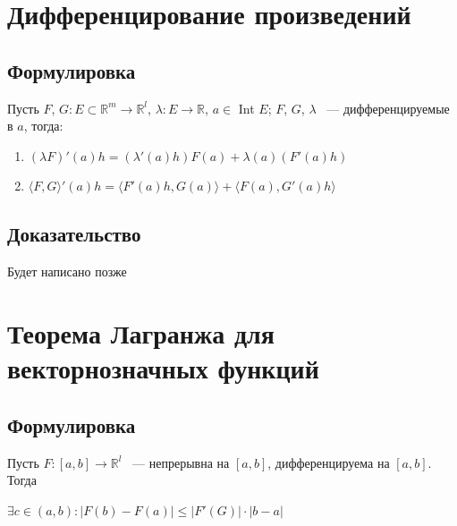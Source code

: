 \documentclass{article}
\begin{document}
    \newpage
    
    \section{Дифференцирование произведений}
    
        \subsection{Формулировка}
        
            Пусть $F$, $G : E \subset \mathbb{R}^m \rightarrow \mathbb{R}^l$, $\lambda : E \rightarrow \mathbb{R}$, $a \in$ Int $E$; $F$, $G$, $\lambda$ ~--- дифференцируемые в $a$, тогда:
            
            \begin{enumerate}
            
                \item $\left( \lambda F \right)'(a)h = (\lambda'(a)h)F(a) + \lambda(a)\left(F'(a)h\right)$
                
                \item $\langle F, G \rangle'(a)h = \langle F'(a)h, G(a)\rangle + \langle F(a), G'(a)h \rangle$
                
            \end{enumerate}
            
        \subsection{Доказательство}
        
            Будет написано позже
            
    \newpage
    
    \section{Теорема Лагранжа для векторнозначных функций}
    
        \subsection{Формулировка}
        
            Пусть $F: [a, b] \rightarrow \mathbb{R}^l$ ~--- непрерывна на $[a, b]$, дифференцируема на $[a, b]$. Тогда
            
            $\exists c \in (a, b) : \left| F(b) - F(a) \right| \leq \left| F'(G) \right| \cdot |b - a|$
            
\end{document}

